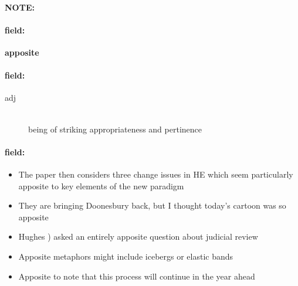 \documentclass[12pt]{article}
\newenvironment{note}{\paragraph{NOTE:}}{}
\newenvironment{field}{\paragraph{field:}}{}
\begin{document}
\begin{note}
\begin{field}
\textbf{\large apposite}
\end{field}


\begin{field}
\begin{description}
\item[adj] \hfill \\ 
being of striking appropriateness and pertinence

\end{description}
\end{field}

\begin{field}
\begin{itemize}
\item The paper then considers three change issues in HE which seem particularly apposite to key elements of the new paradigm
\item They are bringing Doonesbury back, but I thought today's cartoon was so apposite
\item Hughes ) asked an entirely apposite question about judicial review
\item Apposite metaphors might include icebergs or elastic bands
\item Apposite to note that this process will continue in the year ahead
\end{itemize}
\end{field}
\end{note}
\end{document}
